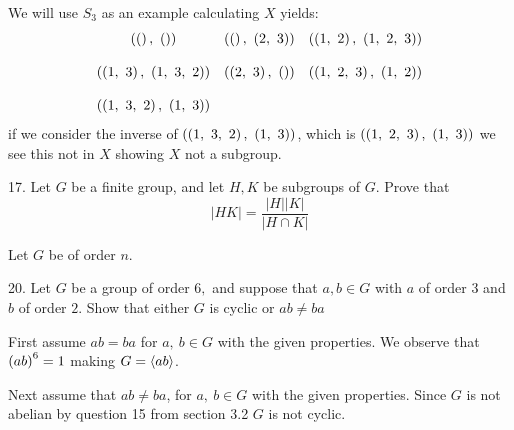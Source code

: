 \begin{mdframed}[style=darkAnswer,frametitle={Joe Starr}]
  We will use $S_3$ as an example calculating $X$ yields:
  $$
  \begin{matrix}
    \left(\left(\right),\ \left(\right)    \right)&
    \left(\left(\right),\ \left(2,\ 3\right)    \right)&
    \left(\left(1,\ 2\right),\ \left(1,\ 2,\ 3\right)    \right)\\ \hspace{.5in} \\
    \left(\left(1,\ 3\right),\ \left(1,\ 3,\ 2\right)    \right)&
    \left(\left(2,\ 3\right),\ \left(\right)    \right)&
    \left(\left(1,\ 2,\ 3\right),\  \left(1,\ 2\right)   \right)\\ \hspace{.5in} \\
    \left(\left(1,\ 3,\ 2\right),\  \left(1,\ 3\right)   \right)&
  \end{matrix}
  $$
  if we consider the inverse of $\left(\left(1,\ 3,\ 2\right),\  \left(1,\ 3\right)\right)$, which is 
  $\lrp{\lrp{1,\ 2,\ 3},\  \lrp{1,\ 3}   }$ we see this not in $X$ showing 
  $X$ not a subgroup. 
\end{mdframed}
\newpage
\begin{mdframed}[style=darkQuesion]
  17. Let $G$ be a finite group, and let $H, K$ be subgroups of $G .$ Prove that
$$
|H K|=\frac{|H||K|}{|H \cap K|}
$$ 
\end{mdframed}
\begin{mdframed}[style=darkAnswer,frametitle={Joe Starr}]
   Let $G$ be of order $n$. 
\end{mdframed}
\newpage
\begin{mdframed}[style=darkQuesion]
20. Let $G$ be a group of order $6,$ and suppose that $a, b \in G$ with $a$ of order 3 and $b$ of order $2 .$ Show that either $G$ is cyclic or $a b \neq b a$
\end{mdframed}
\begin{mdframed}[style=darkAnswer,frametitle={Joe Starr}]
  First assume $ab=ba$ for $a,\ b\in G$ with the given properties. We observe 
  that $\left(ab\right)^6=1$ making $G=\left<ab\right>$. 

  \nd
  Next assume that $ab\neq ba$, for $a,\ b\in G$ with the given properties. 
  Since $G$ is not abelian by question 15 from section 3.2 $G$ is not cyclic.    

\end{mdframed}
